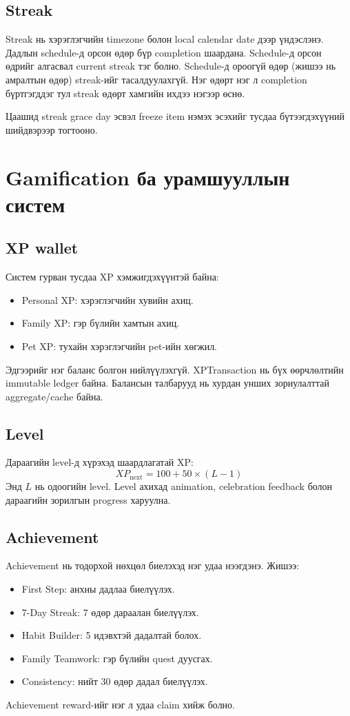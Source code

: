 \documentclass[12pt,a4paper,oneside]{report}
\begin{document}
\section{Streak}
Streak нь хэрэглэгчийн timezone болон local calendar date дээр үндэслэнэ. Дадлын schedule-д орсон өдөр бүр completion шаардана. Schedule-д орсон өдрийг алгасвал current streak тэг болно. Schedule-д ороогүй өдөр (жишээ нь амралтын өдөр) streak-ийг тасалдуулахгүй. Нэг өдөрт нэг л completion бүртгэгддэг тул streak өдөрт хамгийн ихдээ нэгээр өснө.

Цаашид streak grace day эсвэл freeze item нэмэх эсэхийг тусдаа бүтээгдэхүүний шийдвэрээр тогтооно.

\chapter{Gamification ба урамшууллын систем}

\section{XP wallet}
Систем гурван тусдаа XP хэмжигдэхүүнтэй байна:
\begin{itemize}
  \item Personal XP: хэрэглэгчийн хувийн ахиц.
  \item Family XP: гэр бүлийн хамтын ахиц.
  \item Pet XP: тухайн хэрэглэгчийн pet-ийн хөгжил.
\end{itemize}
Эдгээрийг нэг баланс болгон нийлүүлэхгүй. XPTransaction нь бүх өөрчлөлтийн immutable ledger байна. Балансын талбарууд нь хурдан унших зориулалттай aggregate/cache байна.

\section{Level}
Дараагийн level-д хүрэхэд шаардлагатай XP:
\[
XP_{\text{next}} = 100 + 50 \times (L-1)
\]
Энд \(L\) нь одоогийн level. Level ахихад animation, celebration feedback болон дараагийн зорилгын progress харуулна.

\section{Achievement}
Achievement нь тодорхой нөхцөл биелэхэд нэг удаа нээгдэнэ. Жишээ:
\begin{itemize}
  \item First Step: анхны дадлаа биелүүлэх.
  \item 7-Day Streak: 7 өдөр дараалан биелүүлэх.
  \item Habit Builder: 5 идэвхтэй дадалтай болох.
  \item Family Teamwork: гэр бүлийн quest дуусгах.
  \item Consistency: нийт 30 өдөр дадал биелүүлэх.
\end{itemize}
Achievement reward-ийг нэг л удаа claim хийж болно.
\end{document}
